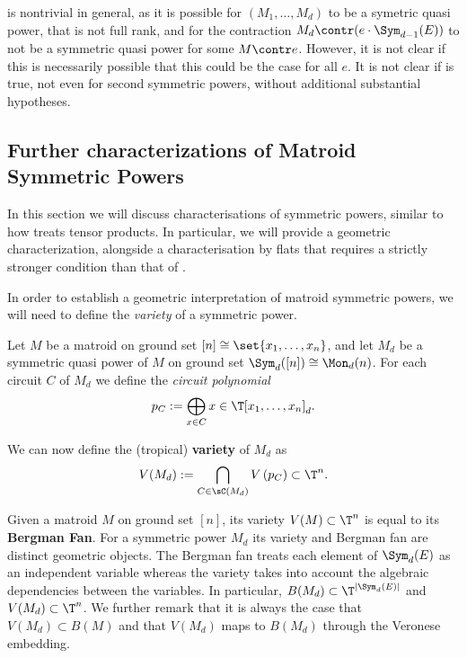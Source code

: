  is nontrivial in general, as it is possible for $(M_1,\dots,M_d)$ to be a symetric quasi power, that is not full rank, and for the contraction $M_d\contr (e\cdot \Sym_{d-1}(E))$ to not be a symmetric quasi power for some $M\contr e$. However, it is not clear if this is necessarily possible that this could be the case for all $e$. It is not clear if  is true, not even for second symmetric powers,  without additional substantial hypotheses.


\subsection{Further characterizations of Matroid Symmetric Powers}\label{subsec:sympowCharacterizations}

In this section we will discuss characterisations of symmetric powers, similar to how  treats tensor products. In particular, we will provide a geometric characterization, alongside a characterisation by flats that requires a strictly stronger condition than that of .

In order to establish a geometric interpretation of matroid symmetric powers, we will need to define the \textit{variety} of a symmetric power.

\begin{definition}\label{def:matroidVariety}
Let $M$ be a matroid on ground set $[n]\cong\set{x_1,\dots,x_n}$, and let $M_d$ be a symmetric quasi power of $M$ on ground set $\Sym_{d}([n])\cong \Mon_d(n)$. For each circuit $C$ of $M_d$ we define the \textit{circuit polynomial}
    $$p_C := \bigoplus_{x\in C} x\in \T[x_1,\dots,x_n]_d.$$

We can now define the (tropical) \textbf{variety} of $M_d$ as
$$V(M_d) : = \bigcap_{C\in \sC(M_d)} V\left(p_C\right)\subset \T^n.$$
\end{definition}

Given a matroid $M$ on ground set $[n]$, its variety $V(M)\subset \T^n$ is equal to its \textbf{Bergman Fan}. For a symmetric power $M_d$ its variety and Bergman fan are distinct geometric objects. The Bergman fan treats each element of $\Sym_d(E)$ as an independent variable whereas the variety takes into account the algebraic dependencies between the variables. In particular, $B(M_d)\subset\T^{|\Sym_d(E)|}$ and $V(M_d)\subset \T^n$. We further remark that it is always the case that $V(M_d)\subset B(M)$ and that $V(M_d)$ maps to $B(M_d)$ through the Veronese embedding.


